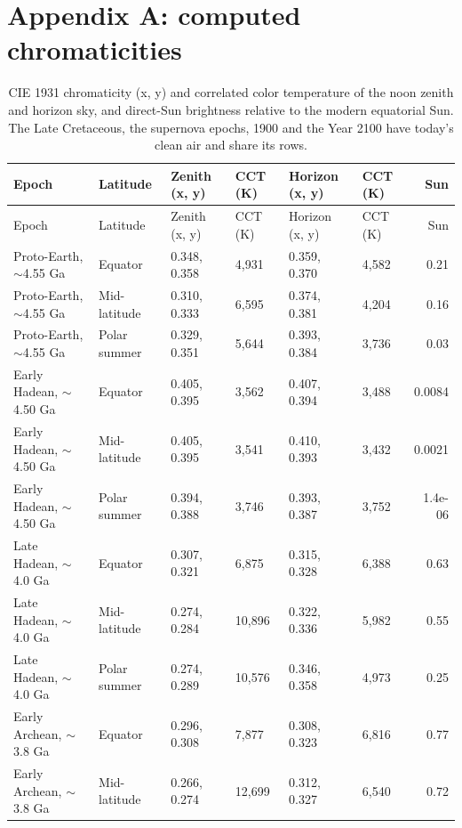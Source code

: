 \documentclass[9pt,twocolumn]{extarticle}
\begin{document}
\nocite{*}

{\footnotesize{}}

\onecolumn
\section*{Appendix A: computed chromaticities}\label{app:chroma}
\scriptsize
{}
\begin{longtable}{@{}llllllr@{}}
\caption{CIE 1931 chromaticity (x, y) and correlated color temperature of the noon zenith and horizon sky, and direct-Sun brightness relative to the modern equatorial Sun. The Late Cretaceous, the supernova epochs, 1900 and the Year 2100 have today's clean air and share its rows.}\label{tab:chroma}\\ \toprule
Epoch & Latitude & Zenith (x, y) & CCT (K) & Horizon (x, y) & CCT (K) & Sun \\ \midrule \endfirsthead
\toprule Epoch & Latitude & Zenith (x, y) & CCT (K) & Horizon (x, y) & CCT (K) & Sun \\ \midrule \endhead
Proto-Earth, $\sim$4.55 Ga & Equator & 0.348, 0.358 & 4,931 & 0.359, 0.370 & 4,582 & 0.21 \\
Proto-Earth, $\sim$4.55 Ga & Mid-latitude & 0.310, 0.333 & 6,595 & 0.374, 0.381 & 4,204 & 0.16 \\
Proto-Earth, $\sim$4.55 Ga & Polar summer & 0.329, 0.351 & 5,644 & 0.393, 0.384 & 3,736 & 0.03 \\
Early Hadean, $\sim$4.50 Ga & Equator & 0.405, 0.395 & 3,562 & 0.407, 0.394 & 3,488 & 0.0084 \\
Early Hadean, $\sim$4.50 Ga & Mid-latitude & 0.405, 0.395 & 3,541 & 0.410, 0.393 & 3,432 & 0.0021 \\
Early Hadean, $\sim$4.50 Ga & Polar summer & 0.394, 0.388 & 3,746 & 0.393, 0.387 & 3,752 & 1.4e-06 \\
Late Hadean, $\sim$4.0 Ga & Equator & 0.307, 0.321 & 6,875 & 0.315, 0.328 & 6,388 & 0.63 \\
Late Hadean, $\sim$4.0 Ga & Mid-latitude & 0.274, 0.284 & 10,896 & 0.322, 0.336 & 5,982 & 0.55 \\
Late Hadean, $\sim$4.0 Ga & Polar summer & 0.274, 0.289 & 10,576 & 0.346, 0.358 & 4,973 & 0.25 \\
Early Archean, $\sim$3.8 Ga & Equator & 0.296, 0.308 & 7,877 & 0.308, 0.323 & 6,816 & 0.77 \\
Early Archean, $\sim$3.8 Ga & Mid-latitude & 0.266, 0.274 & 12,699 & 0.312, 0.327 & 6,540 & 0.72 \\

\end{longtable}
\end{document}
